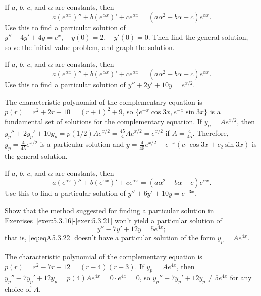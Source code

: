 \documentclass{ximera}
\begin{document}
\begin{problem}\label{exer:5.3.19} If $a$, $b$, $c$, and $\alpha$ are constants, then
$$
a(e^{\alpha x})''+b(e^{\alpha x})'+ce^{\alpha x}=(a\alpha^2+b\alpha+c)e^{\alpha
x}.
$$
Use this to find a
particular solution of $y''-4y'+4y=e^{x}, \quad  y(0)=2,\quad y'(0)=0$. Then find the general solution, solve the initial value problem,
and graph the solution.
\end{problem}

\begin{problem}\label{exer:5.3.20} 
If $a$, $b$, $c$, and $\alpha$ are constants, then
$$
a(e^{\alpha x})''+b(e^{\alpha x})'+ce^{\alpha x}=(a\alpha^2+b\alpha+c)e^{\alpha
x}.
$$
Use this to find a
particular solution of $y''+2y'+10y=e^{x/2}$.
\begin{solution}
The characteristic polynomial of the complementary equation is
$p(r)=r^2+2r+10=(r+1)^2+9$, so
$\{e^{-x}\cos3x,e^{-x}\sin3x\}$
is a fundamental set of solutions for the complementary equation.
If $y_p=Ae^{x/2}$, then
$y_p''+2y_p'+10y_p=p(1/2)Ae^{x/2}=\frac{45}{4}Ae^{x/2}=e^{x/2}$
if $A=\frac{4}{45}$.
Therefore, $y_p=\frac{4}{45}e^{x/2}$ is a particular solution and
$y=\frac{4}{45}e^{x/2}+e^{-x}(c_1\cos3x+c_2\sin3x)$
 is the general solution.
\end{solution}
\end{problem}

\begin{problem}\label{exer:5.3.21} 
If $a$, $b$, $c$, and $\alpha$ are constants, then
$$
a(e^{\alpha x})''+b(e^{\alpha x})'+ce^{\alpha x}=(a\alpha^2+b\alpha+c)e^{\alpha
x}.
$$
Use this to find a
particular solution of $y''+6y'+10y=e^{-3x}$.
\end{problem}

\begin{problem}\label{exer:5.3.22}
Show that the method suggested for finding a particular
solution in Exercises~\ref{exer:5.3.16}-\ref{exer:5.3.21}
won't yield a particular solution of \begin{equation}\label{eq:eqA5.3.22}
y''-7y'+12y=5e^{4x};
\end{equation}
that is,  \ref{eq:eqA5.3.22} doesn't have a particular solution
of the form $y_p=Ae^{4x}$.
\begin{solution}
The characteristic polynomial of the complementary equation is
$p(r)=r^2-7r+12=(r-4)(r-3)$. If $y_p=Ae^{4x}$, then
$y_p''-7y_p'+12y_p=p(4)Ae^{4x}=0\cdot e^{4x}=0$, so
$y_p''-7y_p'+12y_p\ne5e^{4x}$ for any choice of $A$.
\end{solution}
\end{problem}
\end{document}

